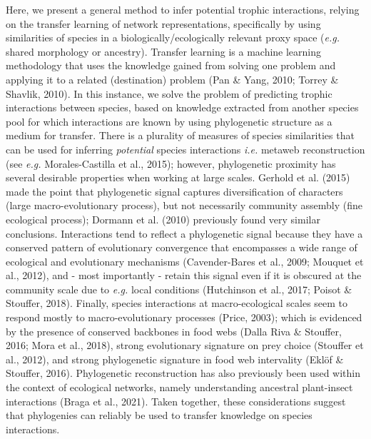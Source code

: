 \documentclass[10pt,oneside]{article}
\begin{document}
Here, we present a general method to infer potential trophic
interactions, relying on the transfer learning of network
representations, specifically by using similarities of species in a
biologically/ecologically relevant proxy space (\emph{e.g.} shared
morphology or ancestry). Transfer learning is a machine learning
methodology that uses the knowledge gained from solving one problem and
applying it to a related (destination) problem (Pan \& Yang, 2010;
Torrey \& Shavlik, 2010). In this instance, we solve the problem of
predicting trophic interactions between species, based on knowledge
extracted from another species pool for which interactions are known by
using phylogenetic structure as a medium for transfer. There is a
plurality of measures of species similarities that can be used for
inferring \emph{potential} species interactions \emph{i.e.} metaweb
reconstruction (see \emph{e.g.} Morales-Castilla et al., 2015); however,
phylogenetic proximity has several desirable properties when working at
large scales. Gerhold et al. (2015) made the point that phylogenetic
signal captures diversification of characters (large macro-evolutionary
process), but not necessarily community assembly (fine ecological
process); Dormann et al. (2010) previously found very similar
conclusions. Interactions tend to reflect a phylogenetic signal because
they have a conserved pattern of evolutionary convergence that
encompasses a wide range of ecological and evolutionary mechanisms
(Cavender-Bares et al., 2009; Mouquet et al., 2012), and - most
importantly - retain this signal even if it is obscured at the community
scale due to \emph{e.g.} local conditions (Hutchinson et al., 2017;
Poisot \& Stouffer, 2018). Finally, species interactions at
macro-ecological scales seem to respond mostly to macro-evolutionary
processes (Price, 2003); which is evidenced by the presence of conserved
backbones in food webs (Dalla Riva \& Stouffer, 2016; Mora et al.,
2018), strong evolutionary signature on prey choice (Stouffer et al.,
2012), and strong phylogenetic signature in food web intervality (Eklöf
\& Stouffer, 2016). Phylogenetic reconstruction has also previously been
used within the context of ecological networks, namely understanding
ancestral plant-insect interactions (Braga et al., 2021). Taken
together, these considerations suggest that phylogenies can reliably be
used to transfer knowledge on species interactions.
\end{document}
